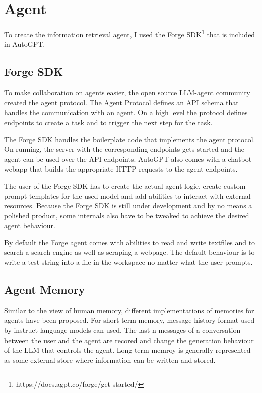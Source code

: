 \documentclass[english, version-2022-01]{uzl-thesis}
\begin{document}
\section{Agent}

To create the information retrieval agent,
I used the Forge SDK\footnote{https://docs.agpt.co/forge/get-started/} that is included in AutoGPT.

\subsection{Forge SDK}

To make collaboration on agents easier,
the open source LLM-agent community created the agent protocol.
The Agent Protocol defines an API schema
that handles the communication with an agent.
On a high level the protocol defines endpoints to create a task
and to trigger the next step for the task.

The Forge SDK handles the boilerplate code
that implements the agent protocol.
On running,
the server with the corresponding endpoints gets started and
the agent can be used over the API endpoints.
AutoGPT also comes with a chatbot webapp
that builds the appropriate HTTP requests to the agent endpoints.

The user of the Forge SDK has to create the actual agent logic,
create custom prompt templates for the used model and
add abilities to interact with external resources.
Because the Forge SDK is still under development
and by no means a polished product,
some internals also have to be tweaked to achieve the desired agent behaviour.

By default the Forge agent comes with abilities to read and write textfiles and
to search a search engine as well as scraping a webpage.
The default behaviour is to write a test string into a file
in the workspace no matter what the user prompts.

\subsection{Agent Memory}

Similar to the view of human memory,
different implementations of memories for agents have been proposed.
For short-term memory,
message history format used by instruct language models can used.
The last n messages of a conversation between the user and the agent
are recored and change the generation behaviour of the LLM
that controls the agent.
Long-term memroy is generally represented as some external store
where information can be written and stored.
\end{document}
